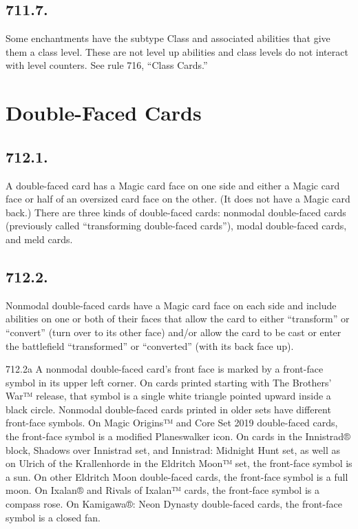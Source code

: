 \subsection*{711.7.}
Some enchantments have the subtype Class and associated abilities that give them a class level. These are not level up abilities and class levels do not interact with level counters. See rule 716, “Class Cards.”

\section{Double-Faced Cards}
\subsection*{712.1.}
A double-faced card has a Magic card face on one side and either a Magic card face or half of an oversized card face on the other. (It does not have a Magic card back.) There are three kinds of double-faced cards: nonmodal double-faced cards (previously called “transforming double-faced cards”), modal double-faced cards, and meld cards.

\subsection*{712.2.}
Nonmodal double-faced cards have a Magic card face on each side and include abilities on one or both of their faces that allow the card to either “transform” or “convert” (turn over to its other face) and/or allow the card to be cast or enter the battlefield “transformed” or “converted” (with its back face up).

712.2a A nonmodal double-faced card’s front face is marked by a front-face symbol in its upper left corner. On cards printed starting with The Brothers’ War™ release, that symbol is a single white triangle pointed upward inside a black circle. Nonmodal double-faced cards printed in older sets have different front-face symbols. On Magic Origins™ and Core Set 2019 double-faced cards, the front-face symbol is a modified Planeswalker icon. On cards in the Innistrad® block, Shadows over Innistrad set, and Innistrad: Midnight Hunt set, as well as on Ulrich of the Krallenhorde in the Eldritch Moon™ set, the front-face symbol is a sun. On other Eldritch Moon double-faced cards, the front-face symbol is a full moon. On Ixalan® and Rivals of Ixalan™ cards, the front-face symbol is a compass rose. On Kamigawa®: Neon Dynasty double-faced cards, the front-face symbol is a closed fan.

